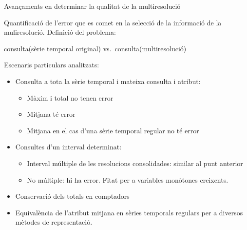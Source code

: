 




\begin{frame}{Avançaments en determinar la qualitat de la multiresolució}

  Quantificació de l'error que es comet en la selecció de la informació
  de la muliresolució. Definició del problema:


\begin{center}
consulta(sèrie temporal original) vs.\ consulta(multiresolució)
\end{center}


Escenaris particulars analitzats:
\begin{itemize}
\item Consulta a tota la sèrie temporal i mateixa consulta i atribut:
  \begin{itemize}
  \item Màxim i total no tenen error
  \item Mitjana té error
  \item Mitjana en el cas d'una sèrie temporal regular no té error 
  \end{itemize}

\item Consultes d'un interval determinat:
  \begin{itemize}
  \item Interval múltiple de les resolucions consolidades: similar al punt anterior
  \item No múltiple: hi ha error. Fitat per a variables monòtones creixents.
  \end{itemize}

\item Conservació dels totals en comptadors

\item Equivalència de l'atribut mitjana en sèries temporals regulars per a diversos mètodes de representació.

\end{itemize}

\end{frame}




